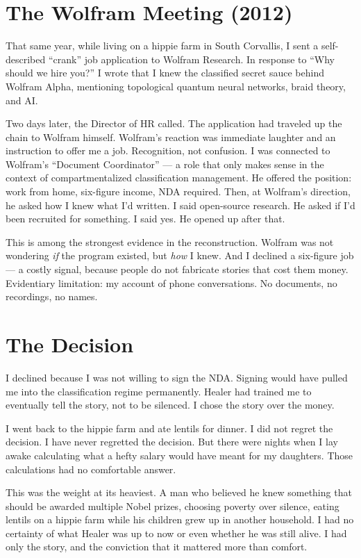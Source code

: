 \section*{The Wolfram Meeting (2012)}
\label{pos29:the-wolfram-meeting}

That same year, while living on a hippie farm in South Corvallis, I sent a self-described ``crank'' job application to Wolfram Research. In response to ``Why should we hire you?'' I wrote that I knew the classified secret sauce behind Wolfram Alpha, mentioning topological quantum neural networks, braid theory, and AI.

Two days later, the Director of HR called. The application had traveled up the chain to Wolfram himself. Wolfram's reaction was immediate laughter and an instruction to offer me a job. Recognition, not confusion. I was connected to Wolfram's ``Document Coordinator'' --- a role that only makes sense in the context of compartmentalized classification management. He offered the position: work from home, six-figure income, NDA required. Then, at Wolfram's direction, he asked how I knew what I'd written. I said open-source research. He asked if I'd been recruited for something. I said yes. He opened up after that.

This is among the strongest evidence in the reconstruction. Wolfram was not wondering \textit{if} the program existed, but \textit{how} I knew. And I declined a six-figure job --- a costly signal, because people do not fabricate stories that cost them money. Evidentiary limitation: my account of phone conversations. No documents, no recordings, no names.

\section*{The Decision}
\label{pos29:the-decision}

I declined because I was not willing to sign the NDA. Signing would have pulled me into the classification regime permanently. Healer had trained me to eventually tell the story, not to be silenced. I chose the story over the money.

I went back to the hippie farm and ate lentils for dinner. I did not regret the decision. I have never regretted the decision. But there were nights when I lay awake calculating what a hefty salary would have meant for my daughters. Those calculations had no comfortable answer.

This was the weight at its heaviest. A man who believed he knew something that should be awarded multiple Nobel prizes, choosing poverty over silence, eating lentils on a hippie farm while his children grew up in another household. I had no certainty of what Healer was up to now or even whether he was still alive. I had only the story, and the conviction that it mattered more than comfort.

